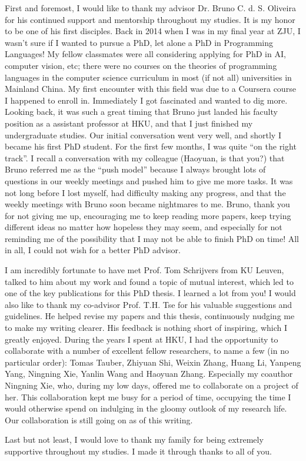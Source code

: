 
First and foremost, I would like to thank my advisor Dr. Bruno C. d. S. Oliveira
for his continued support and mentorship throughout my studies. It is my honor
to be one of his first disciples. Back in 2014 when I was in my final year at
ZJU, I wasn't sure if I wanted to pursue a PhD, let alone a PhD in Programming
Languages! My fellow classmates were all considering applying for PhD in AI,
computer vision, etc; there were no courses on the theories of programming
languages in the computer science curriculum in most (if not all) universities
in Mainland China. My first encounter with this field was due to a Coursera
course I happened to enroll in. Immediately I got fascinated and wanted to dig
more. Looking back, it was such a great timing that Bruno just landed his
faculty position as a assistant professor at HKU, and that I just finished my
undergraduate studies. Our initial conversation went very well, and shortly I
became his first PhD student. For the first few months, I was quite ``on the
right track''. I recall a conversation with my colleague (Haoyuan, is that you?)
that Bruno referred me as the ``push model'' because I always brought lots of
questions in our weekly meetings and pushed him to give me more tasks. It was
not long before I lost myself, had difficulty making any progress, and that the
weekly meetings with Bruno soon became nightmares to me. Bruno, thank you for
not giving me up, encouraging me to keep reading more papers, keep trying
different ideas no matter how hopeless they may seem, and especially for not
reminding me of the possibility that I may not be able to finish PhD on time!
All in all, I could not wish for a better PhD advisor.

I am incredibly fortunate to have met Prof. Tom Schrijvers from KU Leuven,
talked to him about my work and found a topic of mutual interest, which led to
one of the key publications for this PhD thesis. I learned a lot from you! I
would also like to thank my co-advisor Prof. T.H. Tse for his valuable
suggestions and guidelines. He helped revise my papers and this thesis,
continuously nudging me to make my writing clearer. His feedback is nothing
short of inspiring, which I greatly enjoyed. During the years I spent at HKU, I
had the opportunity to collaborate with a number of excellent fellow
researchers, to name a few (in no particular order): Tomas Tauber, Zhiyuan Shi,
Weixin Zhang, Huang Li, Yanpeng Yang, Ningning Xie, Yanlin Wang and Haoyuan
Zhang. Especially my coauthor Ningning Xie, who, during my low days, offered me
to collaborate on a project of her. This collaboration kept me busy for a period
of time, occupying the time I would otherwise spend on indulging in the gloomy
outlook of my research life. Our collaboration is still going on as of this writing.

Last but not least, I would love to thank my family for being extremely
supportive throughout my studies. I made it through thanks to all of you.